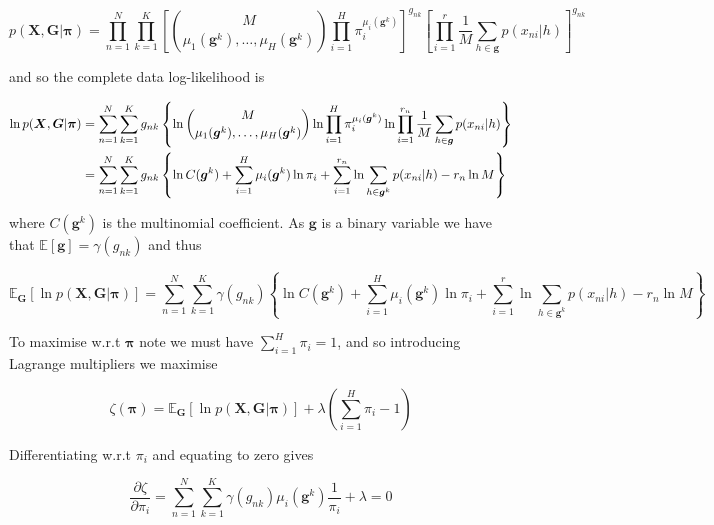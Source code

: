 \documentclass{article}
\begin{document}
\begin{equation} 
    p(\boldsymbol{X}, \boldsymbol{G} | \boldsymbol{\pi}) = \prod_{n = 1}^N \prod_{k = 1}^K \left[ \binom{M}{\mu_1(\boldsymbol{g}^k),\dots,\mu_H(\boldsymbol{g}^k)} \prod_{i = 1}^H \pi_i^{\mu_i(\boldsymbol{g}^k)} \right]^{g_{nk}} \left[ \prod_{i = 1}^{r} \frac{1}{M} \sum_{h \in \boldsymbol{g}} p(x_{ni} | h) \right]^{g_{nk}}
\end{equation}

and so the complete data log-likelihood is

\begin{align} 
    \ln p(\boldsymbol{X}, \boldsymbol{G} | \boldsymbol{\pi}) &= \sum_{n = 1}^N \sum_{k = 1}^K g_{nk} \left\{ \ln \binom{M}{\mu_1(\boldsymbol{g}^k),\dots,\mu_H(\boldsymbol{g}^k)} \ln \prod_{i = 1}^H \pi_i^{\mu_i(\boldsymbol{g}^k)} \ln \prod_{i = 1}^{r_n} \frac{1}{M} \sum_{h \in \boldsymbol{g}} p(x_{ni} | h) \right\} \notag \\
    &= \sum_{n = 1}^N \sum_{k = 1}^K g_{nk} \left\{ \ln C(\boldsymbol{g}^k) + \sum_{i = 1}^H \mu_i(\boldsymbol{g}^k) \ln \pi_i + \sum_{i = 1}^{r_n} \ln \sum_{h \in \boldsymbol{g}^k} p(x_{ni} | h) - r_n \ln M \right\}
\end{align}

where $C(\boldsymbol{g}^k)$ is the multinomial coefficient. As $\boldsymbol{g}$ is a binary variable we have that $\mathbb{E}[\boldsymbol{g}] = \gamma(g_{nk})$ and thus

\begin{equation} 
    \mathbb{E}_{\boldsymbol{G}} [\ln p(\boldsymbol{X}, \boldsymbol{G} | \boldsymbol{\pi})] = \sum_{n = 1}^N \sum_{k = 1}^K \gamma(g_{nk}) \left\{ \ln C(\boldsymbol{g}^k) + \sum_{i = 1}^H \mu_i(\boldsymbol{g}^k) \ln \pi_i + \sum_{i = 1}^{r} \ln \sum_{h \in \boldsymbol{g}^k} p(x_{ni} | h) - r_n \ln M \right\}
\end{equation}

To maximise w.r.t $\boldsymbol{\pi}$ note we must have $\sum_{i = 1}^H \pi_i = 1$, and so introducing Lagrange multipliers we maximise

\begin{equation} 
    \zeta(\boldsymbol{\pi}) = \mathbb{E}_{\boldsymbol{G}} [\ln p(\boldsymbol{X}, \boldsymbol{G} | \boldsymbol{\pi})] + \lambda \left( \sum_{i = 1}^H \pi_i - 1 \right)
\end{equation}

Differentiating w.r.t $\pi_i$ and equating to zero gives

\begin{equation}
\label{eq:zeta}
   \frac{\partial \zeta}{\partial \pi_i} = \sum_{n = 1}^N \sum_{k = 1}^K \gamma(g_{nk}) \mu_i(\boldsymbol{g}^k) \frac{1}{\pi_i} + \lambda = 0
\end{equation}
\end{document}
